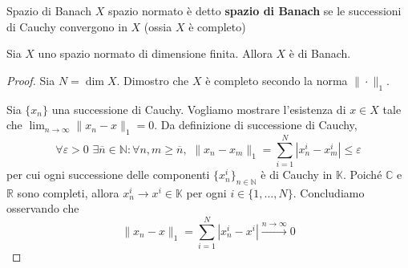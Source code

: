 \begin{definition}{Spazio di Banach}
    \(X\) spazio normato è detto \textbf{spazio di Banach} se le successioni di
    Cauchy convergono in \(X\) (ossia \(X\) è completo)
\end{definition}
\begin{theorem}{}
    Sia \(X\) uno spazio normato di dimensione finita. Allora \(X\) è di Banach.
\end{theorem}
\begin{proof}{}
    Sia \(N = \dim X\). Dimostro che \(X\) è completo secondo la norma \(\|\cdot \|_1\).
    
    Sia \(\{x_{n}\} \) una successione di Cauchy. Vogliamo mostrare l'esistenza
    di \(x \in X\) tale che \(\lim_{n \to \infty} \|x_{n}-x\|_1 = 0\).
    Da definizione di successione di Cauchy, 
    \[
      \forall \varepsilon > 0 \,\, \exists \overline{n} \in \mathbb{N}: \forall
      n,m \ge \overline{n},\,\, \|x_{n}-x_{m}\|_1 = \sum_{i=1}^{N} \left| x_{n}^{i}-x_{m}^{i}\right| \le \varepsilon
    \]
    per cui ogni successione delle componenti \(\{x^{i}_{n}\}_{n \in \mathbb{N}}  \) è di Cauchy in \(\mathbb{K}\). Poiché \(\mathbb{C}\) e \(\mathbb{R}\) sono completi, allora \(x_{n}^{i} \to x^{i} \in \mathbb{K}\) per ogni \(i \in \{1,\dots,N\} \). Concludiamo osservando che
    \[
      \|x_{n}-x\|_1 = \sum_{i=1}^{N} \left| x_{n}^{i} - x^{i}\right| \overset{n\to \infty}{\longrightarrow} 0
    \]
\end{proof}

